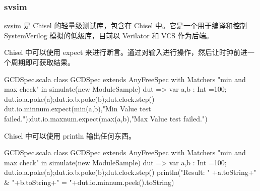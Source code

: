 \documentclass[xcolor=table,dvipsnames,svgnames,aspectratio=169]{ctexbeamer}
\begin{document}
\begin{frame}
  \frametitle{svsim}
  \href{https://github.com/chipsalliance/chisel/blob/main/svsim}{svsim} 是 Chisel 的轻量级测试库，包含在 Chisel 中。它是一个用于编译和控制 SystemVerilog 模拟的低级库，目前以 Verilator 和 VCS 作为后端。
  \par
  Chisel 中可以使用 expect 来进行断言。通过对输入进行操作，然后让时钟前进一个周期即可获取结果。
      \begin{codeblock}[language=scala]{GCDSpec.scala}
class GCDSpec extends AnyFreeSpec with Matchers {
  "min and max check" in {
    simulate(new ModuleSample) { dut =>
      var a,b : Int =100;
      dut.io.a.poke(a);dut.io.b.poke(b);dut.clock.step()
      dut.io.minnum.expect(min(a,b),"Min Value test failed.");dut.io.maxnum.expect(max(a,b),"Max Value test failed.")
    }
  }
}    
          \end{codeblock}

\newpage

Chisel 中可以使用 println 输出任何东西。
\begin{codeblock}[language=scala]{GCDSpec.scala}
class GCDSpec extends AnyFreeSpec with Matchers {
  "min and max check" in {
    simulate(new ModuleSample) { dut =>
      var a,b : Int =100;
      dut.io.a.poke(a);dut.io.b.poke(b);dut.clock.step()
      println("Result: " +a.toString+" & "+b.toString+" = "+dut.io.minnum.peek().toString)
    }
  }
}    
    \end{codeblock}
  \end{frame}
\end{document}

